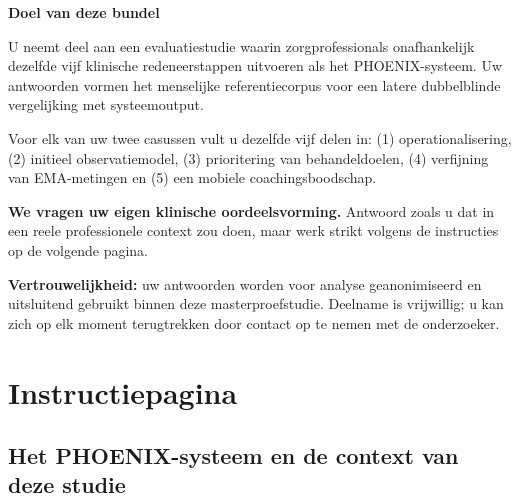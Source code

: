 \documentclass[11pt,a4paper]{article}
\begin{document}
\vspace{0.4cm}

\begin{center}
\begin{tcolorbox}[
  colback=SoftBG,colframe=BorderGrey,
  arc=2mm,left=10pt,right=10pt,top=9pt,bottom=9pt,
  width=0.92\textwidth
]
\textbf{\color{PrimaryBlue}Doel van deze bundel}

\medskip\small
U neemt deel aan een evaluatiestudie waarin zorgprofessionals onafhankelijk dezelfde
vijf klinische redeneerstappen uitvoeren als het PHOENIX-systeem. Uw antwoorden
vormen het menselijke referentiecorpus voor een latere dubbelblinde vergelijking
met systeemoutput.

\smallskip
Voor elk van uw twee casussen vult u dezelfde vijf delen in: (1) operationalisering,
(2) initieel observatiemodel, (3) prioritering van behandeldoelen, (4) verfijning van
EMA-metingen en (5) een mobiele coachingsboodschap.

\smallskip
\textbf{We vragen uw eigen klinische oordeelsvorming.} Antwoord zoals u dat in een
reele professionele context zou doen, maar werk strikt volgens de instructies op de
volgende pagina.
\end{tcolorbox}
\end{center}

\vspace{0.4cm}

\begin{center}
\begin{tcolorbox}[
  colback=AccentAmber,colframe=GoldAmber,
  arc=2mm,boxrule=0.7pt,left=10pt,right=10pt,top=8pt,bottom=8pt,
  width=0.90\textwidth
]
\small\centering
\textbf{\color{GoldAmber}Vertrouwelijkheid:} uw antwoorden worden voor analyse
geanonimiseerd en uitsluitend gebruikt binnen deze masterproefstudie. Deelname is
vrijwillig; u kan zich op elk moment terugtrekken door contact op te nemen met de
onderzoeker.
\end{tcolorbox}
\end{center}

\vfill
\newpage
\tableofcontents
\newpage


\section{Instructiepagina}

\subsection*{Het PHOENIX-systeem en de context van deze studie}
\end{document}
